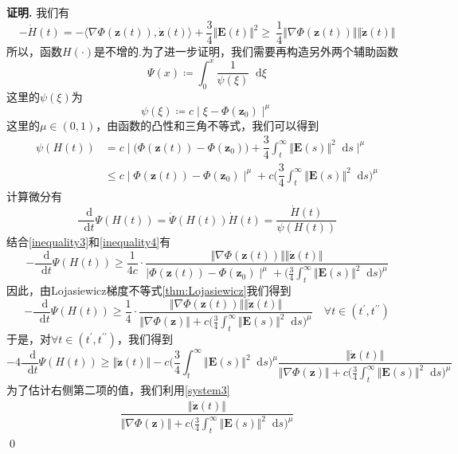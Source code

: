 \documentclass[11pt,a4paper]{article}
\newcommand*{\dif}{\mathop{}\!\mathrm{d}}%
\theoremstyle{definition}
\renewenvironment{proof}{\par\textbf{证明.}\;}{\qed\par}
\begin{document}
	\begin{proof}
		我们有
		\begin{equation}\label{inequality3}
			-\dot{H}(t)=-\langle\nabla\Phi(\textbf{z}(t)),\dot{\textbf{z}}(t)\rangle+\dfrac{3}{4}\Vert\textbf{E}(t)\Vert^{2}\geq\ \dfrac{1}{4}\Vert\nabla\Phi(\textbf{z}(t))\Vert\Vert\dot{\textbf{z}}(t)\Vert
		\end{equation}
		所以，函数$H(\cdot)$是不增的.为了进一步证明，我们需要再构造另外两个辅助函数
		\[ \Psi(x)\coloneqq\int_{0}^{x}\dfrac{1}{\psi(\xi)}\dif\xi \]
		这里的$\psi(\xi)$为
		\[ \psi(\xi)\coloneqq c\mid\xi-\Phi(\textbf{z}_{0})\mid^{\mu} \]
	 	这里的$\mu\in(0,1)$，由函数的凸性和三角不等式，我们可以得到
	 	\begin{align}
	 		\psi(H(t))&= c\mid\big(\Phi(\textbf{z}(t))-\Phi(\textbf{z}_{0})\big)+\dfrac{3}{4}\int_{t}^{\infty}\Vert\textbf{E}(s)\Vert^{2}\dif s\mid^{\mu}\nonumber\\
	 		&\leq c\mid\Phi(\textbf{z}(t))-\Phi(\textbf{z}_{0})\mid^{\mu}+c\Big(\dfrac{3}{4}\int_{t}^{\infty}\Vert\textbf{E}(s)\Vert^{2}\dif s\Big)^{\mu}\label{inequality4}
	 	\end{align}
	 	计算微分有
	 	\[ \dfrac{\dif}{\dif t}\Psi(H(t))=\dot{\Psi}(H(t))\dot{H}(t)=\dfrac{\dot{H}(t)}{\psi(H(t))}\]
	 	结合\eqref{inequality3}和\eqref{inequality4}有
	 	\[ -\dfrac{\dif}{\dif t}\Psi(H(t))\geq\dfrac{1}{4c}\cdot\dfrac{\Vert\nabla\Phi(\textbf{z}(t))\Vert\Vert\dot{\textbf{z}}(t)\Vert}{\mid\Phi(\textbf{z}(t))-\Phi(\textbf{z}_{0})\mid^{\mu}+\Big(\frac{3}{4}\int_{t}^{\infty}\Vert\textbf{E}(s)\Vert^{2}\dif s\Big)^{\mu}} \]
	 	因此，由Lojasiewicz梯度不等式\eqref{thm:Lojasiewicz}我们得到
	 	\[ -\dfrac{\dif}{\dif t}\Psi(H(t))\geq\dfrac{1}{4}\cdot\dfrac{\Vert\nabla\Phi(\textbf{z}(t))\Vert\Vert\dot{\textbf{z}}(t)\Vert}{\Vert\nabla\Phi(\textbf{z})\Vert+c\Big(\frac{3}{4}\int_{t}^{\infty}\Vert\textbf{E}(s)\Vert^{2}\dif s\Big)^{\mu}}\quad\forall t\in(t^{\prime},t^{\prime\prime}) \]
	 	于是，对$\forall t\in(t^{\prime},t^{\prime\prime})$，我们得到
	 	\begin{equation}\label{inequality5}
	 		-4\dfrac{\dif}{\dif t}\Psi(H(t))\geq\Vert\dot{\textbf{z}}(t)\Vert-c\Big(\frac{3}{4}\int_{t}^{\infty}\Vert\textbf{E}(s)\Vert^{2}\dif s\Big)^{\mu}\dfrac{\Vert\dot{\textbf{z}}(t)\Vert}{\Vert\nabla\Phi(\textbf{z})\Vert+c\Big(\frac{3}{4}\int_{t}^{\infty}\Vert\textbf{E}(s)\Vert^{2}\dif s\Big)^{\mu}}
	 	\end{equation}
	 	为了估计右侧第二项的值，我们利用\eqref{system3}
	 	\begin{align}
	 		\dfrac{\Vert\dot{\textbf{z}}(t)\Vert}{\Vert\nabla\Phi(\textbf{z})\Vert+c\Big(\frac{3}{4}\int_{t}^{\infty}\Vert\textbf{E}(s)\Vert^{2}\dif s\Big)^{\mu}}

\end{align}
\end{proof}
\end{document}
